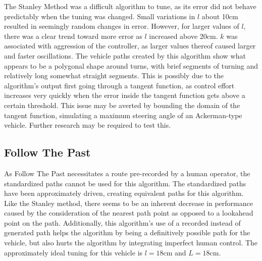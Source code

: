 \documentclass[mla7]{mla}
\begin{document}
\begin{paper}
\begin{figure}[H]
\endminipage
\end{figure}

The Stanley Method was a difficult algorithm to tune, as its error did not behave predictably when the tuning was changed. Small variations in $l$ about 10cm resulted in seemingly random changes in error. However, for larger values of $l$, there was a clear trend toward more error as $l$ increased above 20cm. $k$ was associated with aggression of the controller, as larger values thereof caused larger and faster oscillations. The vehicle paths created by this algorithm show what appears to be a polygonal shape around turns, with brief segments of turning and relatively long somewhat straight segments. This is possibly due to the algorithm's output first going through a tangent function, as control effort increases very quickly when the error inside the tangent function gets above a certain threshold. This issue may be averted by bounding the domain of the tangent function, simulating a maximum steering angle of an Ackerman-type vehicle. Further research may be required to test this.

\subsection{Follow The Past}

As Follow The Past necessitates a route pre-recorded by a human operator, the standardized paths cannot be used for this algorithm. The standardized paths have been approximately driven, creating equivalent paths for this algorithm. Like the Stanley method, there seems to be an inherent decrease in performance caused by the consideration of the nearest path point as opposed to a lookahead point on the path. Additionally, this algorithm's use of a recorded instead of generated path helps the algorithm by being a definitively possible path for the vehicle, but also hurts the algorithm by integrating imperfect human control. The approximately ideal tuning for this vehicle is $l=18$cm and $L=18$cm.


\end{paper}
\end{document}
